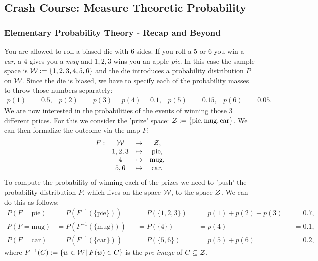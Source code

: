 
%
\subsection{Crash Course: Measure Theoretic Probability}%

\subsubsection{Elementary Probability Theory - Recap and Beyond}

\begin{Eg}%
    \label{example-die}
    You are allowed to roll a biased die with 6 sides. If you roll a $5$ or $6$ you win a \emph{car}, a $4$ 
    gives you a \emph{mug} 
    and $1,2,3$ wins you an apple \emph{pie}. 
    In this case the sample space is $\mathcal{W} :=\{1,2,3,4,5,6\}$ and the die introduces a probability distribution $P$ on $\mathcal{W}$.
    Since the die is biased, we have to specify 
    each of the probability masses to throw those numbers separately: 
    \begin{align*}
        p(1) & = 0.5, &
        p(2) & = p(3) = p(4) = 0.1, &
        p(5) & = 0.15 , & 
        p(6) & = 0.05.
    \end{align*}
    We are now interested in the probabilities of the events of winning those 3 different prices. 
    For this we consider the 'prize' space: $\mathcal{Z} :=\{\mathrm{pie}, \mathrm{mug}, \mathrm{car}\}$. 
    We can then formalize the outcome via the map $F$:
    \[\begin{array}{cccc}
        F: & \mathcal{W} &\to& \mathcal{Z},\\
           &1,2,3 &\mapsto& \mathrm{pie},\\
        & 4 & \mapsto& \mathrm{mug},\\
        & 5,6 & \mapsto& \mathrm{car}.
    \end{array}\]
    To compute the probability of winning each of the prizes we need to 'push' the probability distribution $P$, which lives on the space $\mathcal{W}$, to the space $\mathcal{Z}$. We can do this as follows:
    \begin{align*}
        P(F=\mathrm{pie}) &= P(F^{-1}(\{\mathrm{pie}\})) && = P(\{1,2,3\}) && = p(1)+p(2)+p(3) && = 0.7,\\
            P(F=\mathrm{mug}) &= P(F^{-1}(\{\mathrm{mug}\})) && = P(\{4\}) && = p(4) && = 0.1,\\
            P(F=\mathrm{car}) &= P(F^{-1}(\{\mathrm{car}\})) && = P(\{5,6\}) && = p(5)+p(6) && = 0.2,
    \end{align*}
    where $F^{-1}(C) := \{w \in \mathcal{W}\,|\,F(w) \in C\}$ is the \emph{pre-image} of $C \subseteq \mathcal{Z}$.
\end{Eg}

